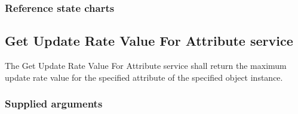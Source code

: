 \begin{compactstdpage}

    \subsubsection{Reference state charts}


    \subsection{Get Update Rate Value For Attribute service}

    The Get Update Rate Value For Attribute service shall return the maximum update rate value for the specified attribute of the specified object instance.

    \subsubsection{Supplied arguments}

\end{compactstdpage}

\clearpage

